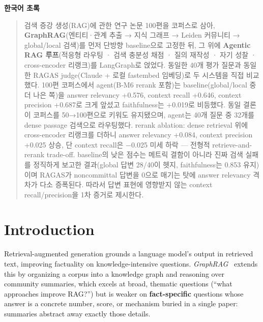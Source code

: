 \documentclass[11pt]{article}
\begin{document}
\begin{center}\textbf{한국어 초록}\end{center}
\begin{quote}
\small
검색 증강 생성(RAG)에 관한 연구 논문 100편을 코퍼스로 삼아, \textbf{GraphRAG}(엔티티·관계 추출 → 지식 그래프 → Leiden 커뮤니티 → global/local 검색)를 먼저 단방향 baseline으로 고정한 뒤, 그 위에 \textbf{Agentic RAG 루프}(적응형 라우팅 · 검색 충분성 채점 · 질의 재작성 · 자기 성찰 · cross-encoder 리랭크)를 LangGraph로 얹었다. 동일한 40개 평가 질문과 동일한 RAGAS judge(Claude + 로컬 fastembed 임베딩)로 두 시스템을 직접 비교했다. 100편 코퍼스에서 agent(B-M6 rerank 포함)는 baseline(global/local 중 더 나은 쪽)을 answer relevancy +0.576, context recall +0.646, context precision +0.687로 크게 앞섰고 faithfulness는 +0.019로 비등했다. 동일 결론이 코퍼스를 50→100편으로 키워도 유지됐으며, agent는 40개 질문 중 32개를 dense passage 검색으로 라우팅했다. rerank ablation: dense retrieval 위에 cross-encoder 리랭크를 더하니 answer relevancy +0.084, context precision +0.025 상승, 단 context recall은 −0.025 미세 하락 — 전형적 retrieve-and-rerank trade-off. baseline의 낮은 점수는 메트릭 결함이 아니라 진짜 검색 실패를 정직하게 보고한 결과(global 답변 28/40이 헷지, faithfulness는 0.853 유지)이며 RAGAS가 noncommittal 답변을 0으로 매기는 탓에 answer relevancy 격차가 다소 증폭된다. 따라서 답변 표현에 영향받지 않는 context recall/precision을 1차 증거로 제시한다.
\end{quote}

\section{Introduction}
Retrieval-augmented generation grounds a language model's output in retrieved text, improving factuality on knowledge-intensive questions. \emph{GraphRAG}~\citep{edge2024graphrag} extends this by organizing a corpus into a knowledge graph and reasoning over community summaries, which excels at broad, thematic questions (``what approaches improve RAG?'') but is weaker on \textbf{fact-specific} questions whose answer is a concrete number, score, or mechanism buried in a single paper: summaries abstract away exactly those details.
\end{document}
